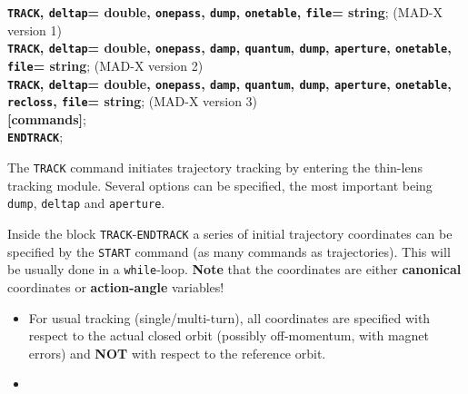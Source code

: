 \begin{description}
\item[Commands]
	\item{\textbf{\texttt{TRACK}, \texttt{deltap}= double, \texttt{onepass}, \texttt{dump}, \texttt{onetable}, \texttt{file}= string}; (MAD-X version 1)
	\\\textbf{\texttt{TRACK}, \texttt{deltap}= double, \texttt{onepass}, \texttt{damp}, \texttt{quantum}, \texttt{dump}, \texttt{aperture}, \texttt{onetable}, \texttt{file}= string}; (MAD-X version 2)
	\\\textbf{\texttt{TRACK}, \texttt{deltap}= double, \texttt{onepass}, \texttt{damp}, \texttt{quantum}, \texttt{dump}, \texttt{aperture}, \texttt{onetable}, \texttt{recloss}, \texttt{file}= string}; (MAD-X version 3)
	\\\textbf{[commands]};
	\\\textbf{\texttt{ENDTRACK}}}; 

	\item[Description] 

          The \texttt{TRACK} command initiates trajectory tracking by entering the 
          thin-lens tracking module. Several options can be specified, the most 
          important being \texttt{dump}, \texttt{deltap} and
          \texttt{aperture}. 
          

          Inside the block \texttt{TRACK}-\texttt{ENDTRACK} a series 
          of initial trajectory coordinates can be specified by the \texttt{START} 
          command (as many commands as trajectories). This will be usually done in a 
          \texttt{while}-loop. \textbf{Note} that the coordinates are either 
          \textbf{canonical} coordinates or \textbf{action-angle} variables!
          \begin{itemize}
	  \item 
            For usual tracking (single/multi-turn), all coordinates are specified with respect to the actual closed 
            orbit (possibly off-momentum, with magnet errors) and \textbf{NOT} with respect 
            to the reference orbit.
	  \item 
            

\end{itemize}
\end{description}
